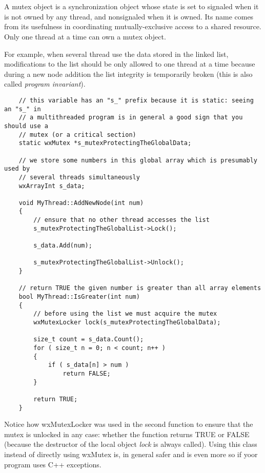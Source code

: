 \section{}\label{wxmutex}

A mutex object is a synchronization object whose state is set to signaled when
it is not owned by any thread, and nonsignaled when it is owned. Its name comes
from its usefulness in coordinating mutually-exclusive access to a shared
resource. Only one thread at a time can own a mutex object.

For example, when several thread use the data stored in the linked list,
modifications to the list should be only allowed to one thread at a time
because during a new node addition the list integrity is temporarily broken
(this is also called {\it program invariant}).


{\small%
\begin{verbatim}
    // this variable has an "s_" prefix because it is static: seeing an "s_" in
    // a multithreaded program is in general a good sign that you should use a
    // mutex (or a critical section)
    static wxMutex *s_mutexProtectingTheGlobalData;

    // we store some numbers in this global array which is presumably used by
    // several threads simultaneously
    wxArrayInt s_data;

    void MyThread::AddNewNode(int num)
    {
        // ensure that no other thread accesses the list
        s_mutexProtectingTheGlobalList->Lock();

        s_data.Add(num);

        s_mutexProtectingTheGlobalList->Unlock();
    }

    // return TRUE the given number is greater than all array elements
    bool MyThread::IsGreater(int num)
    {
        // before using the list we must acquire the mutex
        wxMutexLocker lock(s_mutexProtectingTheGlobalData);

        size_t count = s_data.Count();
        for ( size_t n = 0; n < count; n++ )
        {
            if ( s_data[n] > num )
                return FALSE;
        }

        return TRUE;
    }
\end{verbatim}
}

Notice how wxMutexLocker was used in the second function to ensure that the
mutex is unlocked in any case: whether the function returns TRUE or FALSE
(because the destructor of the local object {\it lock} is always called). Using
this class instead of directly using wxMutex is, in general safer and is even
more so if yoor program uses C++ exceptions.


